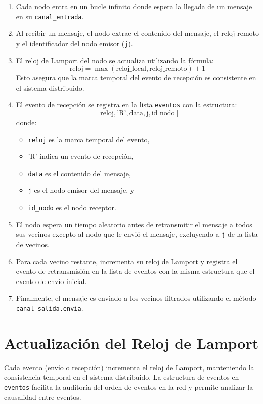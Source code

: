 \begin{enumerate}
	\item Cada nodo entra en un bucle infinito donde espera la llegada de un mensaje en su \texttt{canal\_entrada}.
	\item Al recibir un mensaje, el nodo extrae el contenido del mensaje, el reloj remoto y el identificador del nodo emisor (\texttt{j}).
	\item El reloj de Lamport del nodo se actualiza utilizando la fórmula:
	\[
	\text{reloj} = \max(\text{reloj\_local}, \text{reloj\_remoto}) + 1
	\]
	Esto asegura que la marca temporal del evento de recepción es consistente en el sistema distribuido.
	\item El evento de recepción se registra en la lista \texttt{eventos} con la estructura:
	\[
	[\text{reloj}, \text{'R'}, \text{data}, \text{j}, \text{id\_nodo}]
	\]
	donde:
	\begin{itemize}
		\item \texttt{reloj} es la marca temporal del evento,
		\item 'R' indica un evento de recepción,
		\item \texttt{data} es el contenido del mensaje,
		\item \texttt{j} es el nodo emisor del mensaje, y
		\item \texttt{id\_nodo} es el nodo receptor.
	\end{itemize}
	\item El nodo espera un tiempo aleatorio antes de retransmitir el mensaje a todos sus vecinos excepto al nodo que le envió el mensaje, excluyendo a \texttt{j} de la lista de vecinos.
	\item Para cada vecino restante, incrementa su reloj de Lamport y registra el evento de retransmisión en la lista de eventos con la misma estructura que el evento de envío inicial.
	\item Finalmente, el mensaje es enviado a los vecinos filtrados utilizando el método \texttt{canal\_salida.envia}.
\end{enumerate}

\section{Actualización del Reloj de Lamport}

Cada evento (envío o recepción) incrementa el reloj de Lamport, manteniendo la consistencia temporal en el sistema distribuido. La estructura de eventos en \texttt{eventos} facilita la auditoría del orden de eventos en la red y permite analizar la causalidad entre eventos.




